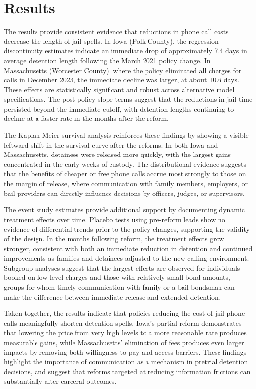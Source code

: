 \documentclass[12pt, a4paper]{article}
\begin{document}
\section{Results}

The results provide consistent evidence that reductions in phone call costs decrease the length of jail spells. In Iowa (Polk County), the regression discontinuity estimates indicate an immediate drop of approximately 7.4 days in average detention length following the March 2021 policy change. In Massachusetts (Worcester County), where the policy eliminated all charges for calls in December 2023, the immediate decline was larger, at about 10.6 days. These effects are statistically significant and robust across alternative model specifications. The post-policy slope terms suggest that the reductions in jail time persisted beyond the immediate cutoff, with detention lengths continuing to decline at a faster rate in the months after the reform.

The Kaplan-Meier survival analysis reinforces these findings by showing a visible leftward shift in the survival curve after the reforms. In both Iowa and Massachusetts, detainees were released more quickly, with the largest gains concentrated in the early weeks of custody. The distributional evidence suggests that the benefits of cheaper or free phone calls accrue most strongly to those on the margin of release, where communication with family members, employers, or bail providers can directly influence decisions by officers, judges, or supervisors.

The event study estimates provide additional support by documenting dynamic treatment effects over time. Placebo tests using pre-reform leads show no evidence of differential trends prior to the policy changes, supporting the validity of the design. In the months following reform, the treatment effects grow stronger, consistent with both an immediate reduction in detention and continued improvements as families and detainees adjusted to the new calling environment. Subgroup analyses suggest that the largest effects are observed for individuals booked on low-level charges and those with relatively small bond amounts, groups for whom timely communication with family or a bail bondsman can make the difference between immediate release and extended detention.

Taken together, the results indicate that policies reducing the cost of jail phone calls meaningfully shorten detention spells. Iowa's partial reform demonstrates that lowering the price from very high levels to a more reasonable rate produces measurable gains, while Massachusetts' elimination of fees produces even larger impacts by removing both willingness-to-pay and access barriers. These findings highlight the importance of communication as a mechanism in pretrial detention decisions, and suggest that reforms targeted at reducing information frictions can substantially alter carceral outcomes.
\end{document}
